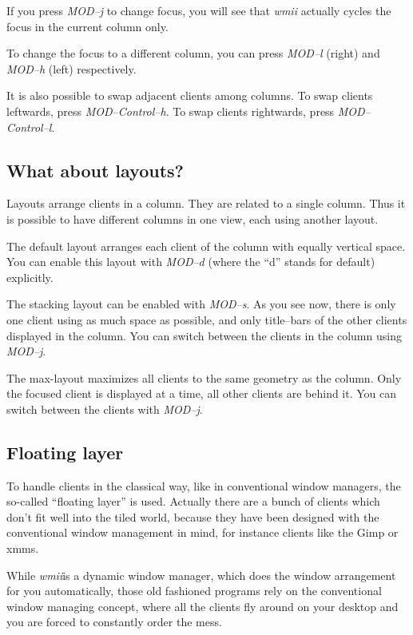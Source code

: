 \documentclass[12pt,a4paper]{article} %
\newcommand{\wmii}{\emph{wmii}}
\begin{document}
    If you press \emph{MOD--j} to change focus, you will see that \wmii
    actually cycles the focus in the current column only.

    To change the focus to a different column, you can press \emph{MOD--l}
    (right) and \emph{MOD--h} (left) respectively.

    It is also possible to swap adjacent clients among columns. To swap
    clients leftwards, press \emph{MOD--Control--h}. To swap clients
    rightwards, press \emph{MOD--Control--l}.

    \subsection{What about layouts?}

    Layouts arrange clients in a column. They are related to a single
    column.  Thus it is possible to have different columns in one view, each
    using another layout.

    The default layout arranges each client of the column with equally
    vertical space. You can enable this layout with \emph{MOD--d}
    (where the ``d'' stands for default) explicitly.

    The stacking layout can be enabled with \emph{MOD--s}.  As you see now,
    there is only one client using as much space as possible, and only
    title--bars of the other clients displayed in the column. You can 
    switch between the clients in the column using \emph{MOD--j}.

    The max-layout maximizes all clients to the same geometry as the column.
    Only the focused client is displayed at a time, all other clients
    are behind it. You can switch between the clients with \emph{MOD--j}.

    \subsection{Floating layer}

    To handle clients in the classical way, like in conventional window
    managers, the so-called ``floating layer'' is used. Actually there are a
    bunch of clients which don't fit well into the tiled world, because they
    have been designed with the conventional window management in mind,
    for instance clients like the Gimp or xmms.

    While \wmii is a dynamic window manager, which does the window arrangement
    for you automatically, those old fashioned programs rely on the
    conventional window managing concept, where all the clients fly around on
    your desktop and you are forced to constantly order the mess.
\end{document}
